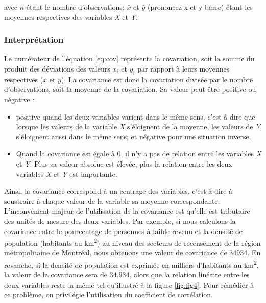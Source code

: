 \documentclass[
  11pt,
  french,
]{book}
\providecommand{\tightlist}{%
  \setlength{\itemsep}{0pt}\setlength{\parskip}{0pt}}
\begin{document}
avec \(n\) étant le nombre d'observations; \(\bar{x}\) et \(\bar{y}\) (prononcez x et y barre) étant les moyennes respectives des variables \emph{X} et \emph{Y}.

\hypertarget{sect04122}{%
\subsubsection{Interprétation}\label{sect04122}}

Le numérateur de l'équation \eqref{eq:cov} représente la covariation, soit la somme du produit des déviations des valeurs \(x_{i}\) et \(y_{i}\) par rapport à leurs moyennes respectives (\(\bar{x}\) et \(\bar{y}\)). La covariance est donc la covariation divisée par le nombre d'observations, soit la moyenne de la covariation. Sa valeur peut être positive ou négative :

\begin{itemize}
\tightlist
\item
  positive quand les deux variables varient dans le même sens, c'est-à-dire que lorsque les valeurs de la variable \emph{X} s'éloignent de la moyenne, les valeurs de \emph{Y} s'éloignent aussi dans le même sens; et négative pour une situation inverse.
\item
  Quand la covariance est égale à 0, il n'y a pas de relation entre les variables \emph{X} et \emph{Y}. Plus sa valeur absolue est élevée, plus la relation entre les deux variables \emph{X} et \emph{Y} est importante.
\end{itemize}

Ainsi, la covariance correspond à un centrage des variables, c'est-à-dire à soustraire à chaque valeur de la variable sa moyenne correspondante. L'inconvénient majeur de l'utilisation de la covariance est qu'elle est tributaire des unités de mesure des deux variables. Par exemple, si nous calculons la covariance entre le pourcentage de personnes à faible revenu et la densité de population (habitants au km\textsuperscript{2}) au niveau des secteurs de recensement de la région métropolitaine de Montréal, nous obtenons une valeur de covariance de 34934. En revanche, si la densité de population est exprimée en milliers d'habitants au km\textsuperscript{2}, la valeur de la covariance sera de 34,934, alors que la relation linéaire entre les deux variables reste la même tel qu'illustré à la figure \ref{fig:fig4}. Pour rémédier à ce problème, on privilégie l'utilisation du coefficient de corrélation.
\end{document}
